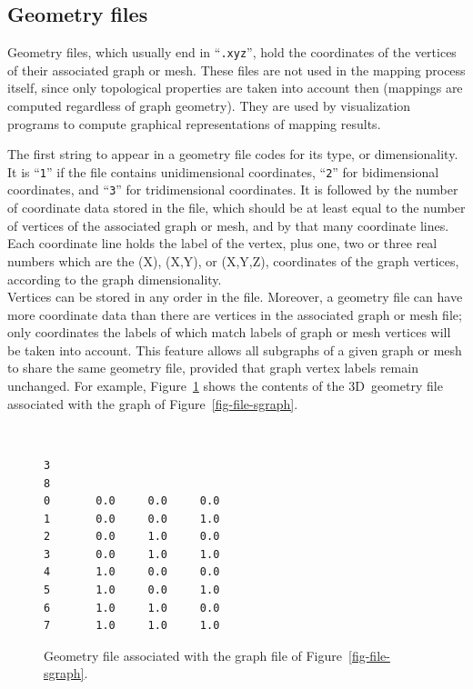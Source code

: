 \subsection{Geometry files}
\label{sec-file-geom}

Geometry files, which usually end in ``\texttt{\@.xyz}'', hold the coordinates
of the vertices of their associated graph or mesh.
These files are not used in the mapping process itself, since only
topological properties are taken into account then (mappings are
computed regardless of graph geometry).
They are used by visualization programs to compute
graphical representations of mapping results.

The first string to appear in a geometry file codes for its type, or
dimensionality. It is ``\texttt{1}'' if the file contains unidimensional
coordinates, ``\texttt{2}'' for bidimensional coordinates, and ``\texttt{3}'' for
tridimensional coordinates.
It is followed by the number of coordinate data stored in the file, which
should be at least equal to the number of vertices of the associated graph
or mesh, and by that many coordinate lines.
Each coordinate line holds the label of the vertex, plus one, two or three
real numbers which are the (X), (X,Y), or (X,Y,Z), coordinates of the graph
vertices, according to the graph dimensionality.
\\
Vertices can be stored in any order in the file. Moreover, a geometry
file can have more coordinate data than there are vertices in the
associated graph or mesh file; only coordinates the labels of which
match labels of graph or mesh vertices will be taken into account.
This feature allows all subgraphs of a given graph or mesh to share the
same geometry file, provided that graph vertex labels remain unchanged.
For example, Figure~\ref{fig-file-geom} shows the contents of the 3D~geometry
file associated with the graph of Figure~\ref{fig-file-sgraph}.
\begin{figure}[hbt]
\begin{center}
\begin{minipage}{4.6cm}
{\renewcommand{\baselinestretch}{1.05}
 \footnotesize \tt
\begin{verbatim}
3
8
0       0.0     0.0     0.0
1       0.0     0.0     1.0
2       0.0     1.0     0.0
3       0.0     1.0     1.0
4       1.0     0.0     0.0
5       1.0     0.0     1.0
6       1.0     1.0     0.0
7       1.0     1.0     1.0
\end{verbatim}
}\end{minipage}
\end{center}
\caption{Geometry file associated with the graph file of
         Figure~\protect\ref{fig-file-sgraph}.}
\label{fig-file-geom}
\end{figure}

